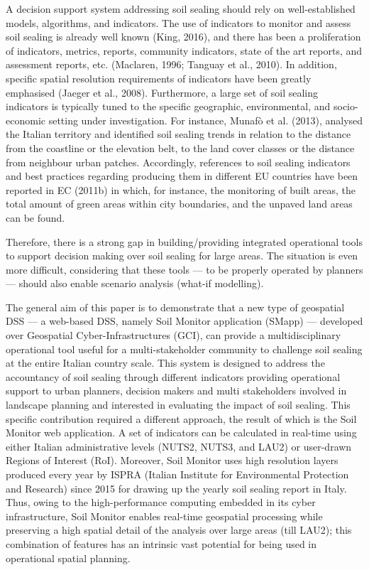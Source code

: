\documentclass[APA,LATO1COL,doublespace]{WileyNJD-v2}
\begin{document}
A decision support system addressing soil sealing should rely on well-established models, algorithms, and indicators. The use of indicators to monitor and assess soil sealing is already well known (King, 2016), and there has been a proliferation of indicators, metrics, reports, community indicators, state of the art reports, and assessment reports, etc. (Maclaren, 1996; Tanguay et al., 2010). In addition, specific spatial resolution requirements of indicators have been greatly emphasised (Jaeger et al., 2008). Furthermore, a large set of soil sealing indicators is typically tuned to the specific geographic, environmental, and socio-economic setting under investigation. For instance, Munafò et al. (2013), analysed the Italian territory and identified soil sealing trends in relation to the distance from the coastline or the elevation belt, to the land cover classes or the distance from neighbour urban patches. Accordingly, references to soil sealing indicators and best practices regarding producing them in different EU countries have been reported in EC (2011b) in which, for instance, the monitoring of built areas, the total amount of green areas within city boundaries, and the unpaved land areas can be found.

Therefore, there is a strong gap in building/providing integrated operational tools to support decision making over soil sealing for large areas. The situation is even more difficult, considering that these tools — to be properly operated by planners — should also enable scenario analysis (what-if modelling).

The general aim of this paper is to demonstrate that a new type of geospatial DSS — a web-based DSS, namely Soil Monitor application (SMapp) — developed over Geospatial Cyber-Infrastructures (GCI), can provide a multidisciplinary operational tool useful for a multi-stakeholder community to challenge soil sealing at the entire Italian country scale. This system is designed to address the accountancy of soil sealing through different indicators providing operational support to urban planners, decision makers and multi stakeholders involved in landscape planning and interested in evaluating the impact of soil sealing. This specific contribution required a different approach, the result of which is the Soil Monitor web application. A set of indicators can be calculated in real-time using either Italian administrative levels (NUTS2, NUTS3, and LAU2) or user-drawn Regions of Interest (RoI). Moreover, Soil Monitor uses high resolution layers produced every year by ISPRA (Italian Institute for Environmental Protection and Research) since 2015 for drawing up the yearly soil sealing report in Italy. Thus, owing to the high-performance computing embedded in its cyber infrastructure, Soil Monitor enables real-time geospatial processing while preserving a high spatial detail of the analysis over large areas (till LAU2); this combination of features has an intrinsic vast potential for being used in operational spatial planning. 
\end{document}
